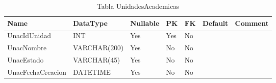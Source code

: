 \begin{table}[h]
	\caption{Tabla UnidadesAcademicas}
	\label{labelTableUnidadesAcademicas}
	\begin{tabular}{ |l|l|l|l|l|l|l| }
		\hline
		Name & DataType & Nullable & PK & FK & Default & Comment \\ \hline
		UnacIdUnidad & INT & Yes & Yes & No &  & \\ \hline 
		UnacNombre & VARCHAR(200) & Yes & No & No &  & \\ \hline 
		UnacEstado & VARCHAR(45) & Yes & No & No &  & \\ \hline 
		UnacFechaCreacion & DATETIME & Yes & No & No &  & \\ \hline 
		
	\end{tabular}
\end{table}
